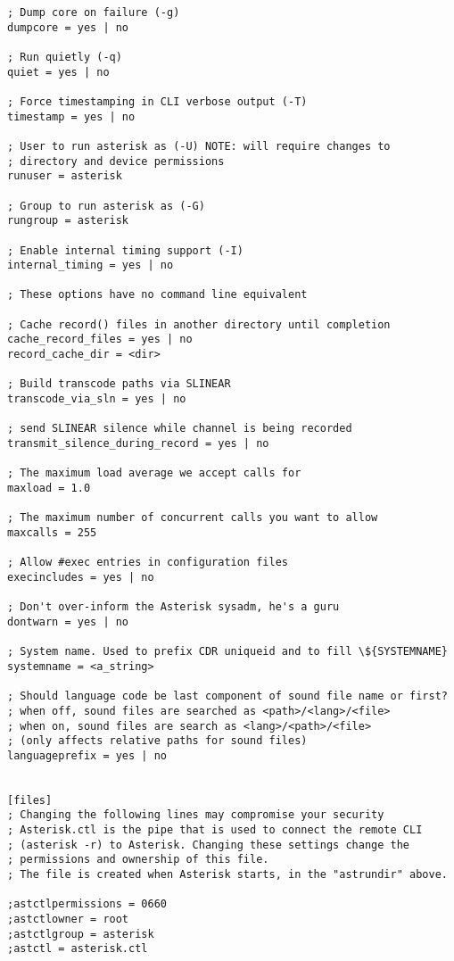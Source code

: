 \begin{verbatim}
; Dump core on failure (-g)
dumpcore = yes | no

; Run quietly (-q)
quiet = yes | no

; Force timestamping in CLI verbose output (-T)
timestamp = yes | no

; User to run asterisk as (-U) NOTE: will require changes to
; directory and device permissions
runuser = asterisk				

; Group to run asterisk as (-G)
rungroup = asterisk

; Enable internal timing support (-I)
internal_timing = yes | no

; These options have no command line equivalent

; Cache record() files in another directory until completion
cache_record_files = yes | no			
record_cache_dir = <dir>

; Build transcode paths via SLINEAR
transcode_via_sln = yes | no 			

; send SLINEAR silence while channel is being recorded
transmit_silence_during_record = yes | no

; The maximum load average we accept calls for
maxload = 1.0

; The maximum number of concurrent calls you want to allow
maxcalls = 255 

; Allow #exec entries in configuration files
execincludes = yes | no

; Don't over-inform the Asterisk sysadm, he's a guru
dontwarn = yes | no

; System name. Used to prefix CDR uniqueid and to fill \${SYSTEMNAME}
systemname = <a_string>

; Should language code be last component of sound file name or first?
; when off, sound files are searched as <path>/<lang>/<file>
; when on, sound files are search as <lang>/<path>/<file>
; (only affects relative paths for sound files)
languageprefix = yes | no			


[files]
; Changing the following lines may compromise your security
; Asterisk.ctl is the pipe that is used to connect the remote CLI
; (asterisk -r) to Asterisk. Changing these settings change the
; permissions and ownership of this file. 
; The file is created when Asterisk starts, in the "astrundir" above.

;astctlpermissions = 0660
;astctlowner = root
;astctlgroup = asterisk
;astctl = asterisk.ctl

\end{verbatim}
